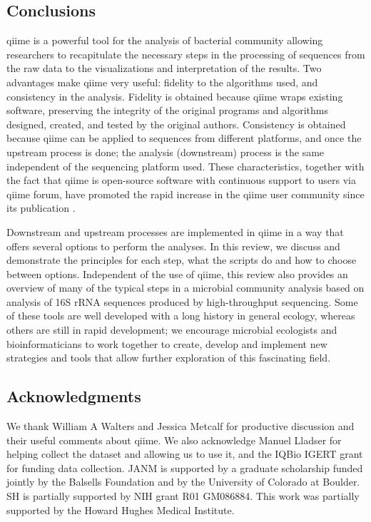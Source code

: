 \subsection{Conclusions}
\gls{qiime} is a powerful tool for the analysis of bacterial community allowing researchers
to recapitulate the necessary steps in the processing of sequences from the raw data
to the visualizations and interpretation of the results. Two advantages make \gls{qiime} very
useful: fidelity to the algorithms used, and consistency in the analysis. Fidelity is obtained
because \gls{qiime} wraps existing software, preserving the integrity of the original programs and
algorithms designed, created, and tested by the original authors. Consistency is obtained
because \gls{qiime} can be applied to sequences from different platforms, and once the upstream
process is done; the analysis (downstream) process is the same independent of the sequencing
platform used. These characteristics, together with the fact that \gls{qiime} is open-source software
with continuous support to users via \gls{qiime} forum, have promoted the rapid increase in the \gls{qiime}
user community since its publication \cite{Caporaso2010}.

Downstream and upstream processes are implemented in \gls{qiime} in a way that offers several options
to perform the analyses. In this review, we discuss and demonstrate the principles for each step,
what the scripts do and how to choose between options. Independent of the use of \gls{qiime}, this
review also provides an overview of many of the typical steps in a microbial community analysis
based on analysis of 16S rRNA sequences produced by high-throughput sequencing. Some of these tools
are well developed with a long history in general ecology, whereas others are still in rapid development;
we encourage microbial ecologists and bioinformaticians to work together to create, develop and implement
new strategies and tools that allow further exploration of this fascinating field.

\subsection{Acknowledgments}
We thank William A Walters and Jessica Metcalf for productive discussion and their
useful comments about \gls{qiime}. We also acknowledge Manuel Lladser for helping
collect the dataset and allowing us to use it, and the IQBio IGERT grant for funding
data collection. JANM is supported by a graduate scholarship funded jointly by the Balsells
Foundation and by the University of Colorado at Boulder. SH is partially supported by
NIH grant R01 GM086884. This work was partially supported by the Howard Hughes Medical Institute.
